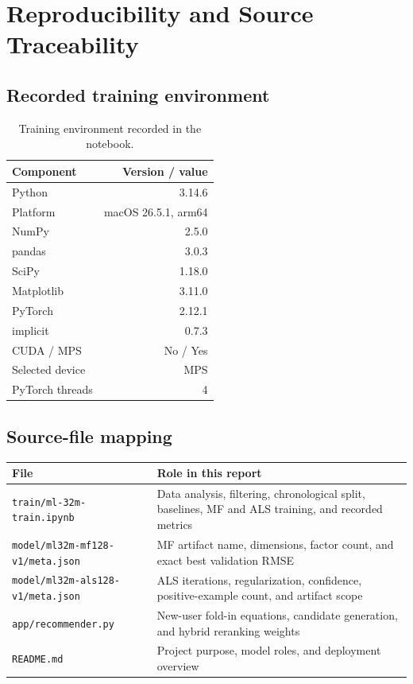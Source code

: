 \documentclass[11pt,a4paper]{article}
\newcommand{\file}[1]{\nolinkurl{#1}}
\begin{document}
\appendix
\section{Reproducibility and Source Traceability}

\subsection{Recorded training environment}

\begin{table}[H]
\centering
\caption{Training environment recorded in the notebook.}
\begin{tabularx}{0.82\textwidth}{@{}Y r@{}}
\toprule
\textbf{Component} & \textbf{Version / value} \\
\midrule
Python & 3.14.6 \\
Platform & macOS 26.5.1, arm64 \\
NumPy & 2.5.0 \\
pandas & 3.0.3 \\
SciPy & 1.18.0 \\
Matplotlib & 3.11.0 \\
PyTorch & 2.12.1 \\
implicit & 0.7.3 \\
CUDA / MPS & No / Yes \\
Selected device & MPS \\
PyTorch threads & 4 \\
\bottomrule
\end{tabularx}
\end{table}

\subsection{Source-file mapping}

{\small
\begin{tabularx}{\textwidth}{@{}p{57mm}Y@{}}
\toprule
\textbf{File} & \textbf{Role in this report} \\
\midrule
\file{train/ml-32m-train.ipynb} & Data analysis, filtering, chronological split, baselines, MF and ALS training, and recorded metrics \\
\file{model/ml32m-mf128-v1/meta.json} & MF artifact name, dimensions, factor count, and exact best validation RMSE \\
\file{model/ml32m-als128-v1/meta.json} & ALS iterations, regularization, confidence, positive-example count, and artifact scope \\
\file{app/recommender.py} & New-user fold-in equations, candidate generation, and hybrid reranking weights \\
\file{README.md} & Project purpose, model roles, and deployment overview \\
\bottomrule
\end{tabularx}
}
\end{document}
